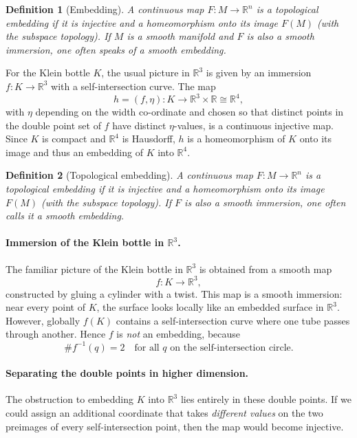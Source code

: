 \documentclass[12pt,a4paper]{article}
\theoremstyle{plain}
\newtheorem{definition}{Definition}
\theoremstyle{definition}      %
\begin{document}
\begin{definition}[Embedding]
	A continuous map $F : M \to \mathbb{R}^n$ is a \emph{topological embedding}
	if it is injective and a homeomorphism onto its image $F(M)$ (with the
	subspace topology).  If $M$ is a smooth manifold and $F$ is also a smooth
	immersion, one often speaks of a \emph{smooth embedding}.
\end{definition}

For the Klein bottle $K$, the usual picture in $\mathbb{R}^3$ is given by an
immersion $f : K \to \mathbb{R}^3$ with a self-intersection curve.  The map
\[
h = (f,\eta) : K \longrightarrow \mathbb{R}^3 \times \mathbb{R}
\cong \mathbb{R}^4,
\]
with $\eta$ depending on the width co-ordinate and chosen so that distinct
points in the double point set of $f$ have distinct $\eta$-values, is a
continuous injective map.  Since $K$ is compact and $\mathbb{R}^4$ is
Hausdorff, $h$ is a homeomorphism of $K$ onto its image and thus an embedding
of $K$ into $\mathbb{R}^4$.

\begin{definition}[Topological embedding]
	A continuous map $F : M \to \mathbb{R}^n$ is a \emph{topological embedding}
	if it is injective and a homeomorphism onto its image $F(M)$
	(with the subspace topology).
	If $F$ is also a smooth immersion, one often calls it a \emph{smooth embedding}.
\end{definition}

\paragraph{Immersion of the Klein bottle in $\mathbb{R}^3$.}
The familiar picture of the Klein bottle in $\mathbb{R}^3$ is obtained from a
smooth map
\[
f : K \longrightarrow \mathbb{R}^3,
\]
constructed by gluing a cylinder with a twist. 
This map is a smooth immersion: near every point of $K$, the surface looks
locally like an embedded surface in $\mathbb{R}^3$.  
However, globally $f(K)$ contains a self-intersection curve where one tube
passes through another.  
Hence $f$ is \emph{not} an embedding, because
\[
\# f^{-1}(q) = 2 \quad \text{for all } q \text{ on the self-intersection circle}.
\]

\paragraph{Separating the double points in higher dimension.}
The obstruction to embedding $K$ into $\mathbb{R}^3$ lies entirely in these
double points.  
If we could assign an additional coordinate that takes \emph{different values}
on the two preimages of every self-intersection point, then the map would
become injective.
\end{document}

